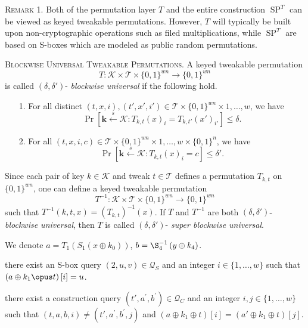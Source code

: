 \textsc{Remark 1.} Both of the permutation layer $T$ and the entire construction $\operatorname{SP}^T$ can be viewed as keyed tweakable permutations. However, $T$ will typically be built upon non-cryptographic operations such as filed multiplications, while  $\operatorname{SP}^T$ are based on S-boxes which are modeled as public random permutations.

\textsc{Blockwise Universal Tweakable Permutations.} A keyed tweakable permutation
$$
T: \mathcal{K} \times \mathcal{T} \times \{0,1\}^{w n} \rightarrow \{0,1\}^{w n}
$$
\noindent is called $(\delta, \delta')$- \emph{blockwise universal} if the following hold.

\begin{itemize}
  \item[1.]
  For all distinct $(t, x, i), (t', x', i') \in \mathcal{T} \times \{0,1\}^{w n} \times {1, \ldots, w}$, we have
  $$
  \operatorname{Pr}\left[\mathbf{k} \stackrel{s}{\leftarrow} \mathcal{K}: T_{k,t}(x)_i = T_{k,t'}(x')_{i'}\right] \leq \delta.
  $$
  \item[2.]
  For all $(t, x, i, c) \in \mathcal{T} \times  \{0,1\}^{w n} \times {1, \ldots, w} \times \{0,1\}^{n}$, we have
  $$
  \operatorname{Pr}\left[\mathbf{k} \stackrel{s}{\leftarrow} \mathcal{K}: T_{k,t}(x)_i = c \right] \leq \delta'.
  $$
\end{itemize}

\noindent Since each pair of key $k \in \mathcal{K}$ and tweak $t \in \mathcal{T}$ defines a permutation $T_{k, t}$ on $\{0,1\}^{w n}$, one can define a keyed tweakable permutation
$$
T^{-1} : \mathcal{K} \times \mathcal{T} \times \{0,1\}^{w n} \rightarrow \{0,1\}^{w n}
$$
\noindent such that $T^{-1}(k, t, x) = (T_{k,t})^{-1}(x)$. If $T$ and $T^{-1}$ are both $(\delta, \delta')$- \emph{blockwise universal}, then $T$ is called $(\delta, \delta')$- \emph{super blockwise universal}.


We denote $a=T_{1}\left(S_{1}\left(x \oplus k_{0}\right)\right)$, $b=\S_{4}^{-1}\left(y \oplus k_{4}\right)$.

\item[2.]
  there exist an S-box query $(2, u, v) \in \mathcal{Q}_{S}$ and an integer $i \in\{1, \ldots, w\}$ such that $\left(a \oplus k_{1} \opus t \right)[i]=u$.

  \item[6.]
  there exist a construction query $\left(t', a^{\prime}, b^{\prime}\right) \in \mathcal{Q}_{C}$ and an integer $i,j \in\{1, \ldots, w\}$ such that $(t, a, b, i) \neq\left(t', a^{\prime}, b^{\prime}, j\right)$ and $\left(a \oplus k_{1} \oplus t \right)[i] = \left(a' \oplus k_{1} \oplus t \right)[j]$.

